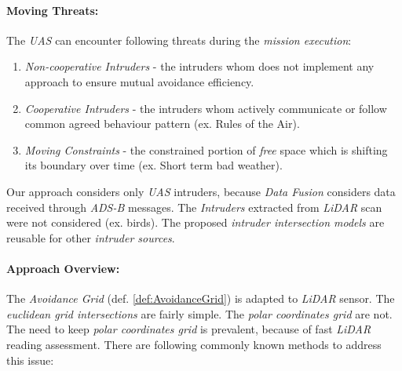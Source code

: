 \paragraph{Moving Threats:} The \emph{UAS} can encounter following threats during the \emph{mission execution}:
\begin{enumerate}
    \item \emph{Non-cooperative Intruders} - the intruders whom does not implement any approach to ensure mutual avoidance efficiency.
    
    \item \emph{Cooperative Intruders} - the intruders whom actively communicate or follow common agreed behaviour pattern (ex. Rules of the Air).
    
    \item \emph{Moving Constraints} - the constrained portion of \emph{free} space which is shifting its boundary over time (ex. Short term bad weather).
\end{enumerate}
    
\begin{note}
    Our approach considers only \emph{UAS} intruders, because \emph{Data Fusion} considers data received through \emph{ADS-B} messages. The \emph{Intruders} extracted from \emph{LiDAR} scan were not considered (ex. birds). The proposed \emph{intruder intersection models} are reusable for other \emph{intruder sources}.
\end{note}

\paragraph{Approach Overview:} The \emph{Avoidance Grid} (def. \ref{def:AvoidanceGrid}) is adapted to \emph{LiDAR} sensor. The \emph{euclidean grid intersections} are fairly simple. The \emph{polar coordinates grid} are not. The need to keep \emph{polar coordinates grid} is prevalent, because of fast \emph{LiDAR} reading assessment.  There are following commonly known methods to address this issue:

